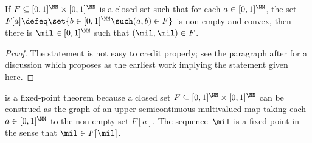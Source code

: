 \begin{theorem}
  \label{thm:generalized-Brouwer}%
  If $F \subseteq [0,1]^\NN \times [0,1]^\NN$ is a closed set such that for each $a \in [0,1]^\NN$, the set $F[a] \defeq \set{b \in [0,1]^\NN \such (a, b) \in F}$ is non-empty and convex, then there is $\mil \in [0,1]^\NN$ such that $(\mil,\mil) \in F$.
\end{theorem}

\begin{proof}
  The statement is not easy to credit properly; see the paragraph after \cite[Thm~6.1]{miller04:_cont_deg} for a discussion which proposes \cite{Eilenberg1946} as the earliest work implying the statement given here.
\end{proof}

 is a fixed-point theorem because a closed set $F \subseteq [0,1]^\NN \times [0,1]^\NN$ can be construed as the graph of an upper semicontinuous multivalued map taking each $a \in [0,1]^\NN$ to the non-empty set $F[a]$.
%
The sequence~$\mil$ is a fixed point in the sense that $\mil \in F[\mil]$.

